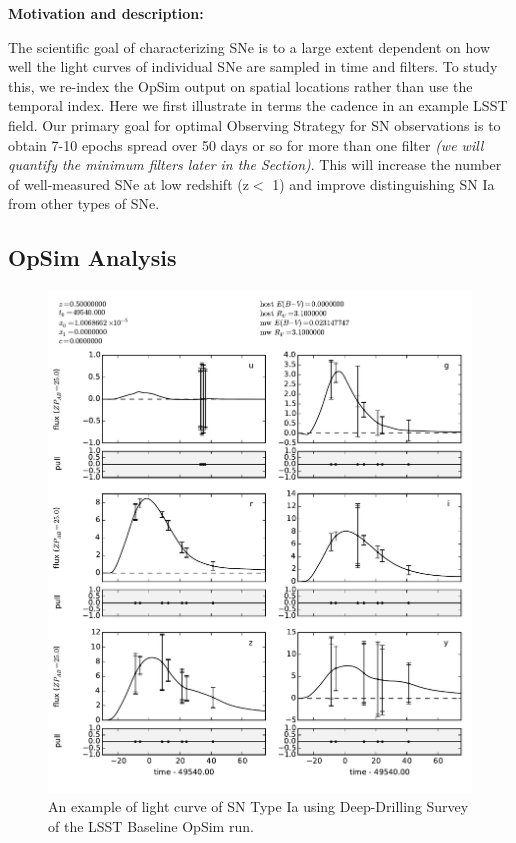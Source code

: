 {\bf Motivation and description:}

The scientific goal of characterizing SNe is to a large extent dependent
on how well the light curves of individual SNe are sampled in time and
filters. To study this, we re-index the OpSim output on spatial
locations rather than use the temporal index. Here we first illustrate
in terms the cadence in an example LSST field. Our primary goal for
optimal Observing Strategy for SN observations is to obtain 7-10 epochs
spread over 50 days or so for more than one filter {\it (we will
quantify the minimum filters later in the Section)}. This will increase
the number of well-measured SNe at low redshift (z$<$ 1) and improve
distinguishing SN Ia from other types of SNe.

\subsection{OpSim Analysis}
\label{sec:\secname:analysis}




\begin{figure}[tbh!]
\includegraphics[angle=0,width=14truecm]{figs/SN_290_lc.pdf}
\caption{An example of light curve of SN Type Ia using Deep-Drilling
Survey of the LSST Baseline OpSim run.
}
\label{fig:SNIaLCopsimdeep}
\end{figure}



